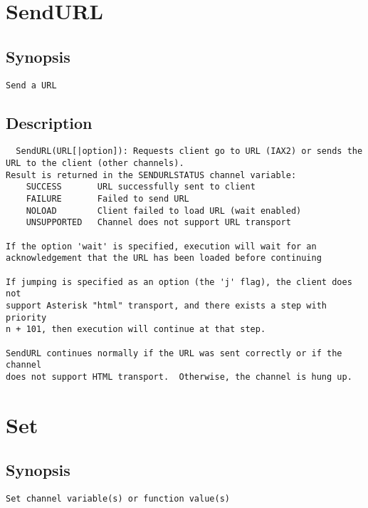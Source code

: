 \section{SendURL}
\subsection{Synopsis}
\begin{verbatim}
Send a URL
\end{verbatim}
\subsection{Description}
\begin{verbatim}
  SendURL(URL[|option]): Requests client go to URL (IAX2) or sends the 
URL to the client (other channels).
Result is returned in the SENDURLSTATUS channel variable:
    SUCCESS       URL successfully sent to client
    FAILURE       Failed to send URL
    NOLOAD        Client failed to load URL (wait enabled)
    UNSUPPORTED   Channel does not support URL transport

If the option 'wait' is specified, execution will wait for an
acknowledgement that the URL has been loaded before continuing

If jumping is specified as an option (the 'j' flag), the client does not
support Asterisk "html" transport, and there exists a step with priority
n + 101, then execution will continue at that step.

SendURL continues normally if the URL was sent correctly or if the channel
does not support HTML transport.  Otherwise, the channel is hung up.

\end{verbatim}


\section{Set}
\subsection{Synopsis}
\begin{verbatim}
Set channel variable(s) or function value(s)
\end{verbatim}
